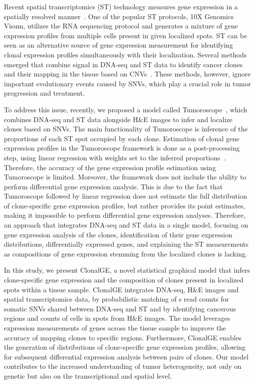 \documentclass[unnumsec,webpdf,contemporary,large]{oup-authoring-template}%
\theoremstyle{thmstyleone}%
\theoremstyle{thmstyletwo}%
\theoremstyle{thmstylethree}%
\begin{document}
Recent spatial transcriptomics (ST) technology measures gene expression in a spatially resolved manner~\citep{staahl2016visualization,Cheng2023}. One of the popular ST protocols, 10X Genomics Visum, utilizes the RNA sequencing protocol and generates a mixture of gene expression profiles from multiple cells present in given localized spots. ST can be seen as an alternative source of gene expression measurement for identifying clonal expression profiles simultaneously with their localization. Several methods emerged that combine signal in DNA-seq and ST data to identify cancer clones and their mapping in the tissue based on CNVs~\citep{erickson2022spatially,elyanow2021starch,wu2022cancer}. %
These methods, however, ignore important evolutionary events caused by SNVs, which play a crucial role in tumor progression and treatment. 

To address this issue, recently, we proposed a model called Tumoroscope~\citep{shafighi2024integrative}, which combines DNA-seq and ST data alongside H\&E images to infer and localize clones based on SNVs. The main functionality of Tumoroscope is inference of the proportions of each ST spot occupied by each clone. Estimation of clonal gene expression profiles in the Tumoroscope framework is done as a post-processing step, using linear regression with weights set to the inferred proportions~\citep{shafighi2024integrative}. Therefore, the accuracy of the gene expression profile estimation using Tumoroscope is limited. Moreover, the framework does not include the ability to perform differential gene expression analysis. This is due to the fact that Tumoroscope followed by linear regression does not estimate the full distribution of clone-specific gene expression profiles, but rather provides its point estimates, making it impossible to perform differential gene expression analyses. 
Therefore, an approach that integrates DNA-seq and ST data in a single model, focusing on gene expression analysis of the clones, identification of their gene expression distributions, differentially expressed genes, and explaining the ST measurements as compositions of gene expression stemming from the localized clones is lacking.

In this study, we present ClonalGE, a novel statistical graphical model that infers clone-specific gene expression and the composition of clones present in localized spots within a tissue sample. ClonalGE  integrates DNA-seq, H\&E images and spatial transcriptomics data, by probabilistic matching of s read counts for somatic SNVs shared between DNA-seq and ST and by identifying cancerous regions and  counts of cells in spots from H\&E images.  The model leverages  expression measurements of genes across the tissue sample to improve the accuracy of mapping clones to specific regions. Furthermore, ClonalGE enables the generation of  distributions of clone-specific gene expression profiles, allowing for subsequent differential expression analysis between pairs of clones. Our model contributes to the increased understanding of tumor heterogeneity, not only on genetic but also on the transcriptional and spatial  level.
\end{document}
